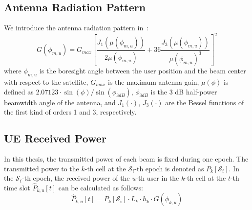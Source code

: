 \subsection{Antenna Radiation Pattern}
We introduce the antenna radiation pattern in~\cite{Energy-Efficient}:
\begin{equation}
    G(\phi_{m,u}) = G_{max} \left[ \frac{J_1\left(\mu(\phi_{m,u})\right)}{2\mu(\phi_{m,u})}
    + 36 \frac{J_3\left(\mu(\phi_{m,u})\right)}{\mu(\phi_{m,u})^3} \right]^2
\end{equation}
where $\phi_{m,u}$ is the boresight angle between the user position and the beam center with respect to the satellite, $G_{max}$ is the maximum antenna gain, $\mu(\phi)$ is defined as $2.07123 \cdot \sin(\phi)/\sin(\phi_{3dB})$, $\phi_{3dB}$ is the 3 dB half-power beamwidth angle of the antenna, and $J_1(\cdot)$, $J_3(\cdot)$ are the Bessel functions of the first kind of orders 1 and 3, respectively.

\subsection{UE Received Power}
In this thesis, the transmitted power of each beam is fixed during one epoch. The transmitted power to the $k$-th cell at the $\mathcal{S}_i$-th epoch is denoted as $P_{k}[\mathcal{S}_i]$. In the $\mathcal{S}_i$-th epoch, the received power of the $u$-th user in the $k$-th cell at the $t$-th time slot $\hat{P}_{k,u}[t]$ can be calculated as follows:
\begin{equation}
    \hat{P}_{k,u}[t] = P_{k}[\mathcal{S}_i] \cdot L_{k} \cdot h_{k} \cdot G(\phi_{k,u}) \label{eq:T-R}
\end{equation}

